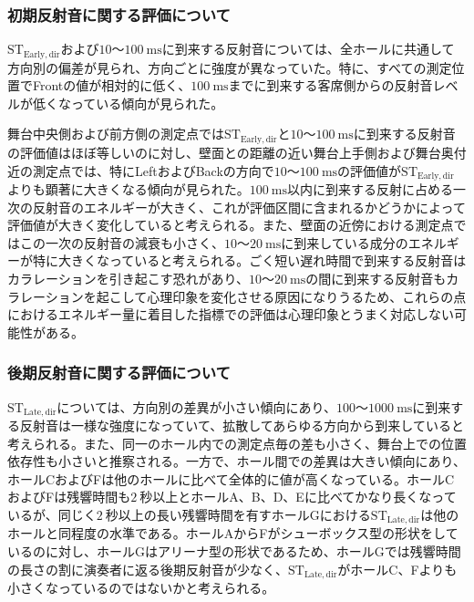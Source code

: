 \documentclass[11pt,a4j]{jreport}
\begin{document}
\subsubsection{初期反射音に関する評価について}

$\mathrm{ST_{Early,dir}}$および$10$～$\SI{100}{\ms}$に到来する反射音については、全ホールに共通して方向別の偏差が見られ、方向ごとに強度が異なっていた。特に、すべての測定位置でFrontの値が相対的に低く、$\SI{100}{\ms}$までに到来する客席側からの反射音レベルが低くなっている傾向が見られた。

舞台中央側および前方側の測定点では$\mathrm{ST_{Early,dir}}$と$10$～$\SI{100}{\ms}$に到来する反射音の評価値はほぼ等しいのに対し、壁面との距離の近い舞台上手側および舞台奥付近の測定点では、特にLeftおよびBackの方向で$10$～$\SI{100}{\ms}$の評価値が$\mathrm{ST_{Early,dir}}$よりも顕著に大きくなる傾向が見られた。$\SI{100}{\ms}$以内に到来する反射に占める一次の反射音のエネルギーが大きく、これが評価区間に含まれるかどうかによって評価値が大きく変化していると考えられる。また、壁面の近傍における測定点ではこの一次の反射音の減衰も小さく、$10$～$\SI{20}{\ms}$に到来している成分のエネルギーが特に大きくなっていると考えられる。ごく短い遅れ時間で到来する反射音はカラレーションを引き起こす恐れがあり、$10$～$\SI{20}{\ms}$の間に到来する反射音もカラレーションを起こして心理印象を変化させる原因になりうるため、これらの点におけるエネルギー量に着目した指標での評価は心理印象とうまく対応しない可能性がある。


\subsubsection{後期反射音に関する評価について}
$\mathrm{ST_{Late,dir}}$については、方向別の差異が小さい傾向にあり、$100$～$\SI{1000}{\ms}$に到来する反射音は一様な強度になっていて、拡散してあらゆる方向から到来していると考えられる。また、同一のホール内での測定点毎の差も小さく、舞台上での位置依存性も小さいと推察される。一方で、ホール間での差異は大きい傾向にあり、ホールCおよびFは他のホールに比べて全体的に値が高くなっている。ホールCおよびFは残響時間も$\SI{2}{秒}$以上とホールA、B、D、Eに比べてかなり長くなっているが、同じく$\SI{2}{秒}$以上の長い残響時間を有すホールGにおける$\mathrm{ST_{Late,dir}}$は他のホールと同程度の水準である。ホールAからFがシューボックス型の形状をしているのに対し、ホールGはアリーナ型の形状であるため、ホールGでは残響時間の長さの割に演奏者に返る後期反射音が少なく、$\mathrm{ST_{Late,dir}}$がホールC、Fよりも小さくなっているのではないかと考えられる。
\end{document}
